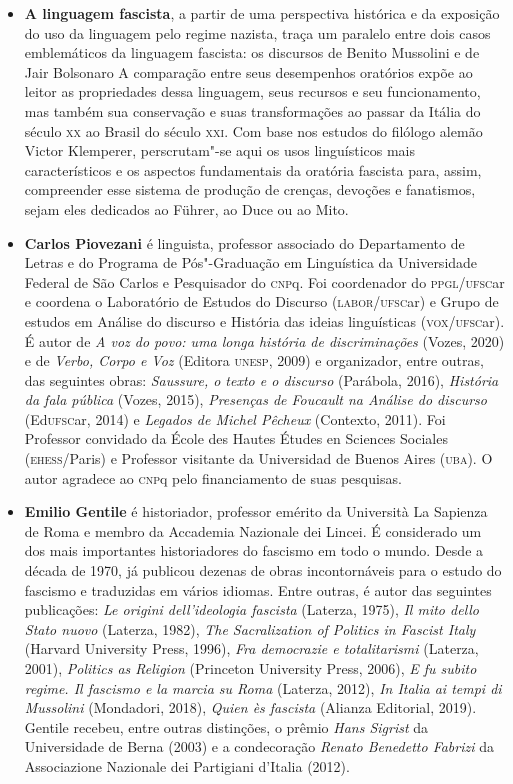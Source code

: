 \begin{itemize}


\item \textbf{A linguagem fascista}, a partir de uma perspectiva histórica e da exposição do uso da linguagem pelo regime nazista, traça um paralelo entre dois casos emblemáticos da linguagem fascista: os discursos de Benito Mussolini e de Jair Bolsonaro A comparação entre seus desempenhos oratórios expõe ao leitor as propriedades dessa linguagem, seus recursos e seu funcionamento, mas também sua conservação e suas transformações ao passar da Itália do século \textsc{xx} ao Brasil do século \textsc{xxi}. Com base nos estudos do filólogo alemão Victor Klemperer, perscrutam"-se aqui os usos linguísticos mais característicos e os aspectos fundamentais da oratória fascista para, assim, compreender esse sistema de produção de crenças, devoções e fanatismos, sejam eles dedicados ao Führer, ao Duce ou ao Mito.
  
\item \textbf{Carlos Piovezani} é linguista, professor associado do
Departamento de Letras e do Programa de Pós"-Graduação em Linguística da
Universidade Federal de São Carlos e Pesquisador do \textsc{cnp}q. Foi
coordenador do \textsc{ppgl/ufsc}ar e coordena o Laboratório de Estudos do
Discurso (\textsc{labor/ufsc}ar) e Grupo de estudos em Análise do
discurso e História das ideias linguísticas (\textsc{vox/ufsc}ar). É
autor de \emph{A voz do povo: uma longa história de discriminações}
(Vozes, 2020) e de \emph{Verbo, Corpo e Voz} (Editora \textsc{unesp}, 2009) e
organizador, entre outras, das seguintes obras: \emph{Saussure, o texto
e o discurso} (Parábola, 2016), \emph{História da fala pública} (Vozes,
2015), \emph{Presenças de Foucault na Análise do discurso} (Ed\textsc{ufsc}ar,
2014) e \emph{Legados de Michel Pêcheux} (Contexto, 2011). Foi Professor
convidado da École des Hautes Études en Sciences Sociales (\textsc{ehess}/Paris)
e Professor visitante da Universidad de Buenos Aires (\textsc{uba}). O autor
agradece ao \textsc{cnp}q pelo financiamento de suas pesquisas.

\item \textbf{Emilio Gentile} é historiador, professor emérito da Università
La Sapienza de Roma e membro da Accademia Nazionale dei Lincei. É
considerado um dos mais importantes historiadores do fascismo em todo o
mundo. Desde a década de 1970, já publicou dezenas de obras
incontornáveis para o estudo do fascismo e traduzidas em vários idiomas.
Entre outras, é autor das seguintes publicações: \emph{Le origini
dell'ideologia fascista} (Laterza, 1975), \emph{Il mito dello Stato
nuovo} (Laterza, 1982), \emph{The Sacralization of Politics in Fascist
Italy} (Harvard University Press, 1996), \emph{Fra democrazie e
totalitarismi} (Laterza, 2001), \emph{Politics as Religion} (Princeton
University Press, 2006), \emph{E fu subito regime. Il fascismo e la
marcia su Roma} (Laterza, 2012), \emph{In Italia ai tempi di Mussolini}
(Mondadori, 2018), \emph{Quien ès fascista} (Alianza Editorial, 2019).
Gentile recebeu, entre outras distinções, o prêmio \emph{Hans Sigrist}
da Universidade de Berna (2003) e a condecoração \emph{Renato Benedetto
Fabrizi} da Associazione Nazionale dei Partigiani d'Italia (2012).

\end{itemize}

